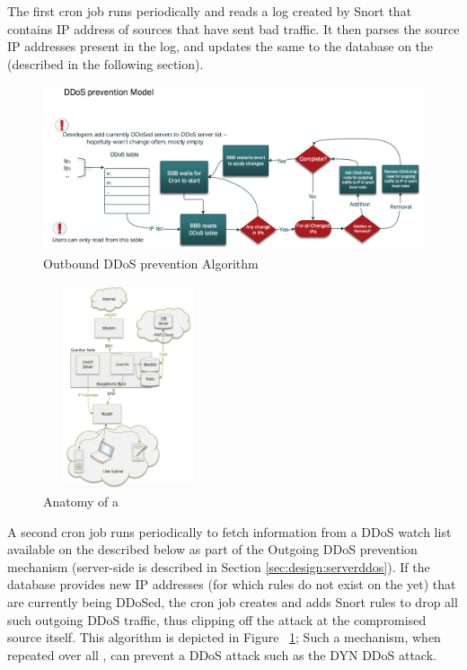 The first cron job runs periodically and reads a log created by Snort that contains IP address of sources that have sent bad traffic. It then parses the source IP addresses present in the log, and updates the same to the database on the \servname (described in the following section). \\

\begin{figure}
    \centering
    \includegraphics[width=0.95\linewidth]{figs/ddostable.png}
    \caption{Outbound DDoS prevention Algorithm}
    \label{fig:ddostable}
\end{figure}

\begin{figure}
    \centering
    \includegraphics[width=5cm, height=6cm]{figs/guardiannode.png}
    \caption{Anatomy of a \servname}
    \label{fig:guardian}
\end{figure}

A second cron job runs periodically to fetch information from a DDoS watch list available on the \servname described below as part of the Outgoing DDoS prevention mechanism (server-side is described in Section \ref{sec:design:serverddos}). If the database provides new IP addresses (for which rules do not exist on the \nodename yet) that are currently being DDoSed, the cron job creates and adds Snort rules to drop all such outgoing DDoS traffic, thus clipping off the attack at the compromised source itself. 
This algorithm is depicted in Figure ~\ref{fig:ddostable}; Such a mechanism, when repeated over all \servnames, can prevent a DDoS attack such as the DYN DDoS attack. \\

